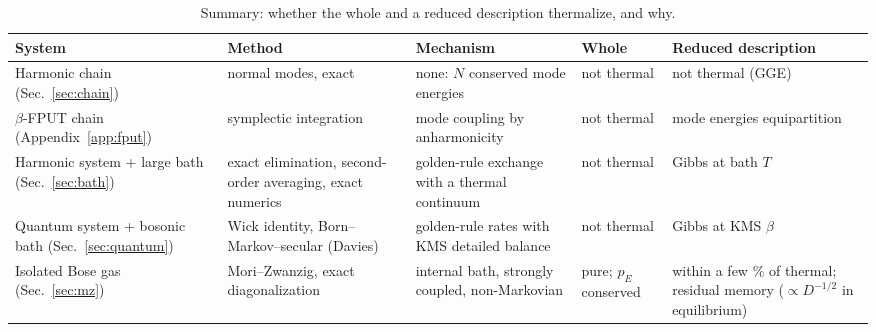 \documentclass[10pt,a4paper]{article}
\renewcommand{\small}{\fontsize{12pt}{14.5pt}\selectfont}
\begin{document}
\begin{table}[h]
\centering
\small
\renewcommand{\arraystretch}{1.25}
\setlength{\tabcolsep}{4pt}
\begin{tabular}{p{} p{} p{} p{} p{}}
\hline
System & Method & Mechanism & Whole & Reduced description \\
\hline
Harmonic chain (Sec.~\ref{sec:chain}) & normal modes, exact & none: $ N $ conserved mode energies & not thermal & not thermal (GGE) \\
$ \beta $-FPUT chain (Appendix~\ref{app:fput}) & symplectic integration & mode coupling by anharmonicity & not thermal & mode energies equipartition \\
Harmonic system + large bath (Sec.~\ref{sec:bath}) & exact elimination, second-order averaging, exact numerics & golden-rule exchange with a thermal continuum & not thermal & Gibbs at bath $ T $ \\
Quantum system + bosonic bath (Sec.~\ref{sec:quantum}) & Wick identity, Born--Markov--secular (Davies) & golden-rule rates with KMS detailed balance & not thermal & Gibbs at KMS $ \beta $ \\
Isolated Bose gas (Sec.~\ref{sec:mz}) & Mori--Zwanzig, exact diagonalization & internal bath, strongly coupled, non-Markovian & pure; $ p_E $ conserved & within a few \% of thermal; residual memory ($ \propto D^{-1/2} $ in equilibrium) \\
\hline
\end{tabular}
\caption{Summary: whether the whole and a reduced description thermalize, and why.}
\label{tab:summary}
\end{table}
\end{document}
